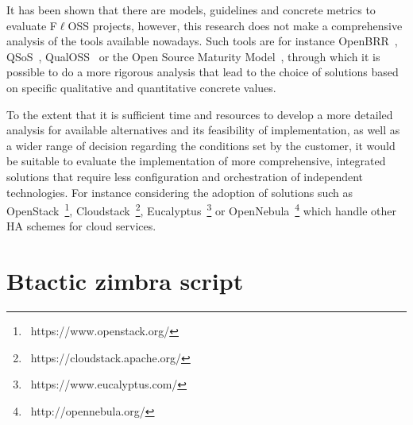 \documentclass[a4paper, 12pt]{book}
\begin{document}
\noindent It has been shown that there are models, guidelines and concrete metrics to evaluate F$\ell$OSS projects, however, this research does not make a comprehensive analysis of the tools available nowadays. Such tools are for instance OpenBRR~\cite{Wasserman}, QSoS~\cite{QSOS}, QualOSS~\cite{QOSS} or the Open Source Maturity Model~\cite{OSMM}, through which it is possible to do a more rigorous analysis that lead to the choice of solutions based on specific qualitative and quantitative concrete values.\bigskip

\noindent To the extent that it is sufficient time and resources to develop a more detailed analysis for available alternatives and its feasibility of implementation, as well as a wider range of decision regarding the conditions set by the customer, it would be suitable to evaluate the implementation of more comprehensive, integrated solutions that require less configuration and orchestration of independent technologies. For instance considering the adoption of solutions such as OpenStack~\footnote{{\tiny\ https://www.openstack.org/}}, Cloudstack~\footnote{{\tiny\ https://cloudstack.apache.org/}}, Eucalyptus~\footnote{{\tiny\ https://www.eucalyptus.com/}} or OpenNebula~\footnote{{\tiny\ http://opennebula.org/}} which handle other HA schemes for cloud services.


%
{}



%
\appendix
\chapter{Btactic zimbra script}
\label{app:appendix1}
\end{document}
